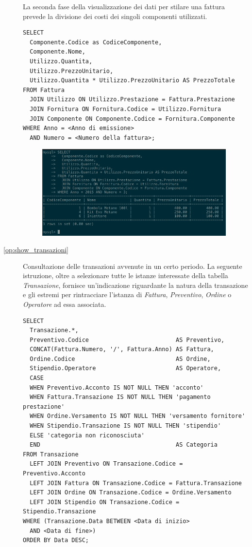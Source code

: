 \begin{description}
              La seconda fase della visualizzazione dei dati per stilare una fattura prevede la divisione dei costi dei singoli componenti utilizzati.

              \begin{lstlisting}
SELECT
  Componente.Codice as CodiceComponente,
  Componente.Nome,
  Utilizzo.Quantita,
  Utilizzo.PrezzoUnitario,
  Utilizzo.Quantita * Utilizzo.PrezzoUnitario AS PrezzoTotale
FROM Fattura
  JOIN Utilizzo ON Utilizzo.Prestazione = Fattura.Prestazione
  JOIN Fornitura ON Fornitura.Codice = Utilizzo.Fornitura
  JOIN Componente ON Componente.Codice = Fornitura.Componente
WHERE Anno = <Anno di emissione> 
  AND Numero = <Numero della fattura>;
              \end{lstlisting}

              \begin{figure}[H]
                \centering
                \includegraphics[width=10cm]{images/screenshots/show_componenti_fattura.png}
              \end{figure}

            \item[\ref{op:show_transazioni}] Consultazione delle transazioni avvenute in un certo periodo. La seguente istruzione, oltre a selezionare tutte le istanze interessate della tabella \emph{Transazione}, fornisce un'indicazione riguardante la natura della transazione e gli estremi per rintracciare l'istanza di \emph{Fattura}, \emph{Preventivo}, \emph{Ordine} o \emph{Operatore} ad essa associata.

              \begin{lstlisting}
SELECT
  Transazione.*,
  Preventivo.Codice                         AS Preventivo,
  CONCAT(Fattura.Numero, '/', Fattura.Anno) AS Fattura,
  Ordine.Codice                             AS Ordine,
  Stipendio.Operatore                       AS Operatore,
  CASE
  WHEN Preventivo.Acconto IS NOT NULL THEN 'acconto'
  WHEN Fattura.Transazione IS NOT NULL THEN 'pagamento prestazione'
  WHEN Ordine.Versamento IS NOT NULL THEN 'versamento fornitore'
  WHEN Stipendio.Transazione IS NOT NULL THEN 'stipendio'
  ELSE 'categoria non riconosciuta'
  END                                       AS Categoria
FROM Transazione
  LEFT JOIN Preventivo ON Transazione.Codice = Preventivo.Acconto
  LEFT JOIN Fattura ON Transazione.Codice = Fattura.Transazione
  LEFT JOIN Ordine ON Transazione.Codice = Ordine.Versamento
  LEFT JOIN Stipendio ON Transazione.Codice = Stipendio.Transazione
WHERE (Transazione.Data BETWEEN <Data di inizio>
  AND <Data di fine>)
ORDER BY Data DESC;
              \end{lstlisting}


\end{description}
